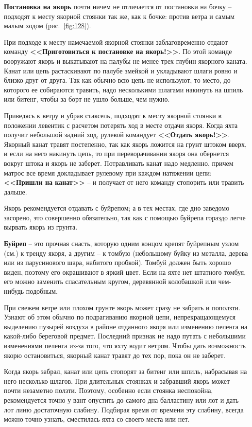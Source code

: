 \documentclass[a4paper, 12pt, twoside, final]{scrbook}
\begin{document}
\textbf{Постановка на якорь} почти ничем не отличается от постановки на бочку \--- подходят к месту якорной стоянки так же, как к бочке: против ветра и самым малым ходом (рис.~\ref{fig:128}).

При подходе к месту намечаемой якорной стоянки заблаговременно отдают команду \textbf{<<Приготовиться к постановке на якорь!>>}. По этой команде вооружают якорь и выкатывают на палубы не менее трех глубин якорного каната. Канат или цепь растаскивают по палубе змейкой и укладывают шлаги ровно и близко друг от друга. Так как обычно всю цепь не используют, то место, до которого ее собираются травить, надо несколькими шлагами накинуть на шпиль или битенг, чтобы за борт не ушло больше, чем нужно.

Приведясь к ветру и убрав стаксель, подходят к месту якорной стоянки в положении левентик с расчетом потерять ход в месте отдачи якоря. Когда яхта получит небольшой задний ход, рулевой командует \textbf{<<Отдать якорь!>>}. Якорный канат травят постепенно, так как якорь ложится на грунт штоком вверх, и если на него накинуть цепь, то при переворачивании якоря она обернется вокруг штока и якорь не заберет. Потравливать канат надо медленно, причем матрос все время докладывает рулевому при каждом натяжении цепи: \textbf{<<Пришли на канат>>} \--- и получает от него команду стопорить или травить дальше.

Якорь рекомендуется отдавать с буйрепом; а в тех местах, где дно заведомо засорено, это совершенно обязательно, так как с помощью буйрепа гораздо легче вырвать якорь из грунта.

\textbf{Буйреп} \--- это прочная снасть, которую одним концом крепят буйрепным узлом (см.) к тренду якоря, а другим \--- к томбую (небольшому буйку из металла, дерева или из парусинового шара, набитого пробкой). Томбуй должен быть хорошо виден, поэтому его окрашивают в яркий цвет. Если на яхте нет штатного томбуя, его можно заменить спасательным кругом, деревянной колобашкой или чем-нибудь подобным.

При свежем ветре или плохом грунте якорь может сразу не забрать и поползти. Узнают об этом обычно по подрагиванию якорной цепи, непрекращающемуся выделению пузырей воздуха в районе отданного якоря или изменению пеленга на какой-либо береговой предмет. Последний признак не надо путать с небольшими изменениями пеленга из-за того, что яхту водит ветром. Чтобы дать возможность якорю остановиться, якорный канат травят до тех пор, пока он не заберет.

Когда якорь забрал, канат или цепь стопорят за битенг или шпиль, набрасывая на него несколько шлагов. При длительных стоянках и забравший якорь может почти незаметно ползти. Поэтому, особенно если стоянка неспокойна, рекомендуется точно у вант опустить до самого дна балластину или лот и дать лот линю достаточную слабину. Подбирая время от времени эту слабину, всегда можно точно узнать, сместилась яхта со своего места или нет.
\end{document}
